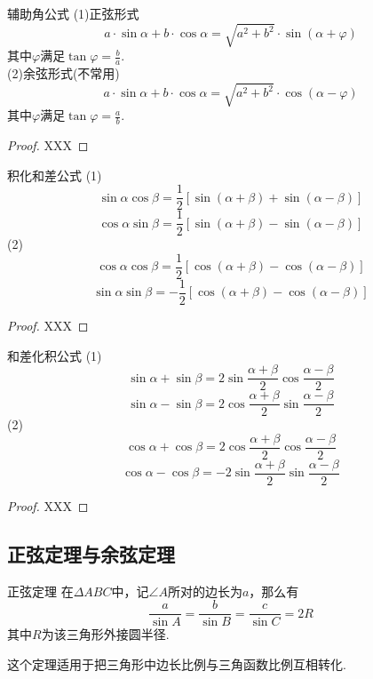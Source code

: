 \documentclass[lang=cn, zihao=5]{elegantbook}
\begin{document}
\begin{proposition}{辅助角公式}
    (1)正弦形式$$a \cdot \sin{\alpha} + b \cdot \cos{\alpha} = \sqrt{a^2+b^2} \cdot \sin{(\alpha + \varphi)}$$
    其中$\varphi$满足$\tan{\varphi}=\frac{b}{a}$.\\
    (2)余弦形式(不常用)$$a \cdot \sin{\alpha} + b \cdot \cos{\alpha} = \sqrt{a^2+b^2} \cdot \cos{(\alpha - \varphi)}$$
    其中$\varphi$满足$\tan{\varphi}=\frac{a}{b}$.
\end{proposition}
\begin{proof}
    XXX
\end{proof}

\begin{proposition}{积化和差公式} %
    (1)$$\sin{\alpha}\cos{\beta}=\frac{1}{2}[\sin{(\alpha+\beta)}+\sin{(\alpha-\beta)}]$$
    $$\cos{\alpha}\sin{\beta}=\frac{1}{2}[\sin{(\alpha+\beta)}-\sin{(\alpha-\beta)}]$$
    (2)$$\cos{\alpha}\cos{\beta}=\frac{1}{2}[\cos{(\alpha+\beta)}-\cos{(\alpha-\beta)}]$$
    $$\sin{\alpha}\sin{\beta}=-\frac{1}{2}[\cos{(\alpha+\beta)}-\cos{(\alpha-\beta)}]$$
\end{proposition}
\begin{proof}
    XXX
\end{proof}

\begin{proposition}{和差化积公式} %
    (1)$$\sin{\alpha}+\sin{\beta}=2\sin{\frac{\alpha+\beta}{2}}\cos{\frac{\alpha-\beta}{2}}$$
    $$\sin{\alpha}-\sin{\beta}=2\cos{\frac{\alpha+\beta}{2}}\sin{\frac{\alpha-\beta}{2}}$$
    (2)$$\cos{\alpha}+\cos{\beta}=2\cos{\frac{\alpha+\beta}{2}}\cos{\frac{\alpha-\beta}{2}}$$
    $$\cos{\alpha}-\cos{\beta}=-2\sin{\frac{\alpha+\beta}{2}}\sin{\frac{\alpha-\beta}{2}}$$
\end{proposition}
\begin{proof}
    XXX
\end{proof}

\subsection{正弦定理与余弦定理}

\begin{theorem}{正弦定理} %
    在$\Delta ABC$中，记$\angle A$所对的边长为$a$，那么有$$\frac{a}{\sin{A}}=\frac{b}{\sin{B}}=\frac{c}{\sin{C}}=2R$$其中$R$为该三角形外接圆半径.
\end{theorem}
这个定理适用于把三角形中边长比例与三角函数比例互相转化.
\end{document}
